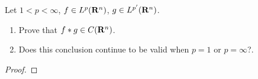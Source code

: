 \begin{problem}
Let $1<p<\infty$, $f\in L^p(\mathbf{R}^n)$, $g\in L^{p'}(\mathbf{R}^n)$.
\begin{enumerate}[label=(\alph*)]
\item Prove that $f*g\in C(\mathbf{R}^n)$.
\item Does this conclusion continue to be valid when $p=1$ or $p=\infty$?.
\end{enumerate}
\end{problem}
\begin{proof}
\end{proof}

